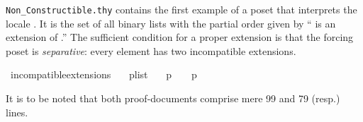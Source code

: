 \texttt{Non\_Constructible.thy} contains the first example of a poset
that interprets the locale
. It is the set of all binary
lists with the partial order given by  `` is an extension of
.'' The sufficient condition for a proper extension is that
the forcing poset is \emph{separative}: every element has two
incompatible extensions.

\begin{isabelle}
\isamarkupfalse%
\ incompatible{\isacharunderscore}extensions{\isacharcolon}\isanewline
\ \ \ {\isachardoublequoteopen}p{\isasymin}list{\isacharparenleft}{}{\isacharparenright}{\isachardoublequoteclose}\isanewline
\ \ \ {\isachardoublequoteopen}{\isacharparenleft}p\ {\isacharat}\ {\isacharbrackleft}{}{\isacharbrackright}{\isacharparenright}\ {\isasymbottom}\ {\isacharparenleft}p\ {\isacharat}\ {\isacharbrackleft}{}{\isacharbrackright}{\isacharparenright}{\isachardoublequoteclose}
\end{isabelle}

It is to be noted that both proof-documents comprise mere 99 and 79
(resp.) lines.
 
